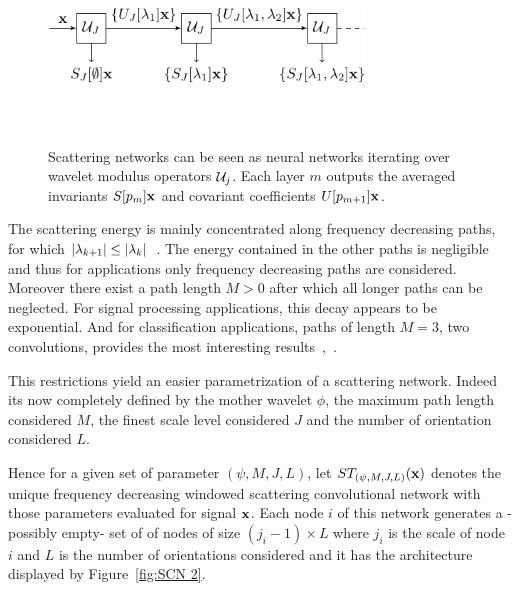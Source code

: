 \documentclass{article}
\begin{document}
    \begin{figure}
      \begin{center}
        \includegraphics[width=3.3in, height=2in, keepaspectratio]{scatnet_crop.pdf}
        \caption[Scattering convolution network.]{\centering  Scattering networks can be seen as neural networks iterating over wavelet  modulus  operators $\mathcal{U}_{j}$. Each layer $m$ outputs the averaged  invariants $S[p_{m}]{\bf x}$ and covariant coefficients $U[p_{m+1}]{\bf x}$.}
        \label{fig:SCN 1}
      \end{center}
      \vspace{-15pt}
    \end{figure}
    
    The scattering energy is mainly concentrated along frequency decreasing paths, \ie for which $\left| \lambda_{k+1} \right| \leq \left| \lambda_{k} \right|$~\cite{mallat2012gis}. The energy contained in the other paths is negligible and thus for applications only frequency decreasing paths are considered. Moreover there exist a path length $M > 0$ after which all longer paths can be neglected. For signal processing applications, this decay appears to be exponential. And for classification applications, paths of length $M = 3$, \ie two convolutions, provides the most interesting results~\cite{anden2011multiscale},~\cite{bruna2010classification}.
      
    This restrictions yield an easier parametrization of a scattering network. Indeed its now completely defined by the mother wavelet $\phi$, the maximum path length considered $M$, the finest scale level considered $J$ and the number of orientation considered $L$.
      
    Hence for a given set of parameter $(\psi, M,J,L)$, let $ST_{(\psi, M,J,L)}({\bf x})$ denotes the unique frequency decreasing windowed scattering convolutional network with those parameters evaluated for signal ${\bf x}$. Each node $i$ of this network generates a -possibly empty- set of of nodes of size $(j_{i}-1) \times L$ where $j_{i}$ is the scale of node $i$ and $L$ is the number of orientations considered and it has the architecture displayed by Figure~\ref{fig:SCN 2}.
\end{document}
